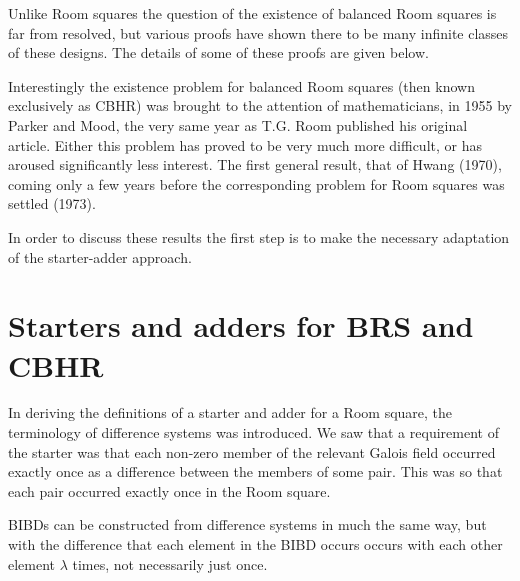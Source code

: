 \documentclass[
  11pt,
  a4paper]{book}
\begin{document}
Unlike Room squares the question of the existence of
balanced Room squares is far from resolved, but various
proofs have shown there to be many infinite classes of these
designs. The details of some of these proofs are given
below.

Interestingly the existence problem for balanced Room
squares (then known exclusively as CBHR) was brought to the
attention of mathematicians, in 1955 by Parker and Mood, the
very same year as T.G. Room published his original article.
Either this problem has proved to be very much more
difficult, or has aroused significantly less interest. The
first general result, that of Hwang (1970), coming only a
few years before the corresponding problem for Room squares
was settled (1973).

In order to discuss these results the first step is to make
the necessary adaptation of the starter-adder approach.

\hypertarget{starters-and-adders-for-brs-and-cbhr}{%
\section{Starters and adders for BRS and CBHR}\label{starters-and-adders-for-brs-and-cbhr}}

In deriving the definitions of a starter and adder for a
Room square, the terminology of difference systems was
introduced. We saw that a requirement of the starter was
that each non-zero member of the relevant Galois field
occurred exactly once as a difference between the members of
some pair. This was so that each pair occurred exactly once
in the Room square.

BIBDs can be constructed from difference systems in much the
same way, but with the difference that each element in the
BIBD occurs occurs with each other element \(\lambda\) times,
not necessarily just once.
\end{document}
